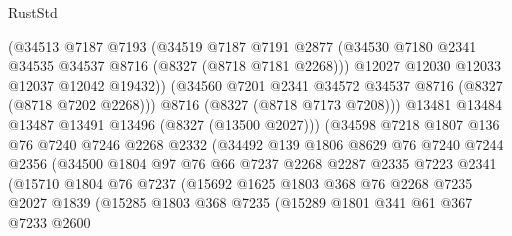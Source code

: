 \begin{lexlean}{RustStd}
\begin{coremodule}
                        (@34513
                          @7187
                          @7193
                          (@34519
                            @7187
                            @7191
                            @2877
                            (@34530 @7180 @2341 @34535 @34537 @8716 (@8327 (@8718 @7181 @2268)))
                            @12027
                            @12030
                            @12033
                            @12037
                            @12042
                            @19432))
                        (@34560 @7201 @2341 @34572 @34537 @8716 (@8327 (@8718 @7202 @2268)))
                        @8716
                        (@8327 (@8718 @7173 @7208)))
                      @13481
                      @13484
                      @13487
                      @13491
                      @13496
                      (@8327 (@13500 @2027)))
                    (@34598
                      @7218
                      @1807
                      @136
                      @76
                      @7240
                      @7246
                      @2268
                      @2332
                      (@34492
                        @139
                        @1806
                        @8629
                        @76
                        @7240
                        @7244
                        @2356
                        (@34500
                          @1804
                          @97
                          @76
                          @66
                          @7237
                          @2268
                          @2287
                          @2335
                          @7223
                          @2341
                          (@15710
                            @1804
                            @76
                            @7237
                            (@15692
                              @1625
                              @1803
                              @368
                              @76
                              @2268
                              @7235
                              @2027
                              @1839
                              (@15285
                                @1803
                                @368
                                @7235
                                (@15289
                                  @1801
                                  @341
                                  @61
                                  @367
                                  @7233
                                  @2600

\end{coremodule}
\end{lexlean}
